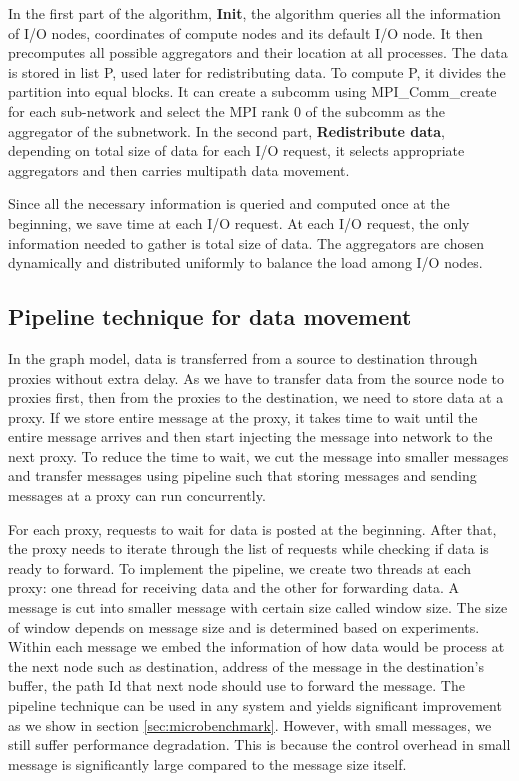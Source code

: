 \documentclass[final,5p,times]{elsarticle}
\begin{document}
In the first part of the algorithm, \textbf{Init}, the algorithm queries all the information of I/O nodes, coordinates of compute nodes and its default I/O node. It then precomputes all possible aggregators and their location at all processes. The data is stored in list P, used later for redistributing data. To compute P, it divides the partition into equal blocks. It can create a subcomm using MPI\_Comm\_create for each sub-network and select the MPI rank 0 of the subcomm as the aggregator of the subnetwork. In the second part, \textbf{Redistribute data}, depending on total size of data for each I/O request, it selects appropriate aggregators and then carries multipath data movement.

Since all the necessary information is queried and computed once at the beginning, we save time at each I/O request. At each I/O request, the only information needed to gather is total size of data. The aggregators are chosen dynamically and distributed uniformly to balance the load among I/O nodes.

\subsection{Pipeline technique for data movement}
In the graph model, data is transferred from a source to destination through proxies without extra delay. As we have to transfer data from the source node to proxies first, then from the proxies to the destination, we need to store data at a proxy. If we store entire message at the proxy, it takes time to wait until the entire message arrives and  then start injecting the message into network to the next proxy. To reduce the time to wait, we cut the message into smaller messages and transfer messages using pipeline such that storing messages and sending messages at a proxy can run concurrently. %


For each proxy, requests to wait for data is posted at the beginning. After that, the proxy needs to iterate through the list of requests while checking if data is ready to forward. To implement the pipeline, we create two threads at each proxy: one thread for receiving data and the other for forwarding data. A message is cut into smaller message with certain size called window size. The size of window depends on message size and is determined based on experiments. Within each message we embed the information of how data would be process at the next node such as destination, address of the message in the destination's buffer, the path Id that next node should use to forward the message. The pipeline technique can be used in any system and yields significant improvement as we show in section \ref{sec:microbenchmark}. However, with small messages, we still suffer performance degradation. This is because the control overhead in small message is significantly large compared to the message size itself.
\end{document}
